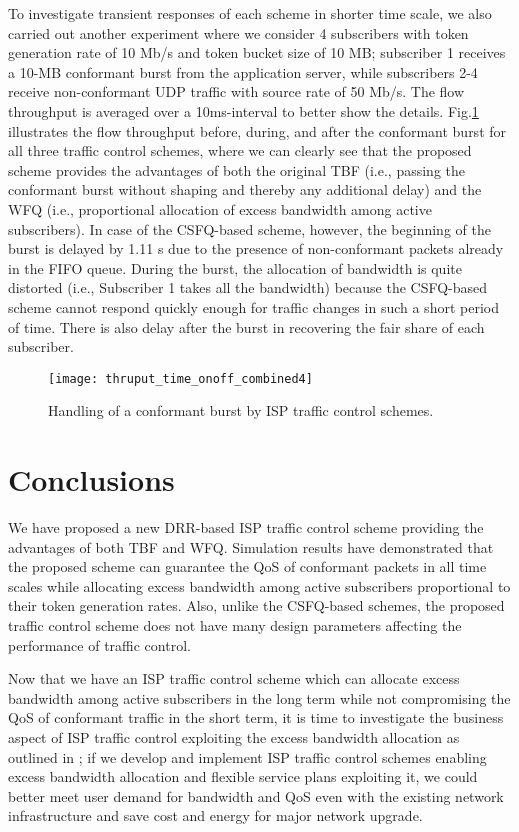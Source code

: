 \documentclass[conference,twoside,final]{IEEEtran}
\begin{document}
To investigate transient responses of each scheme in shorter time scale, we also
carried out another experiment where we consider 4 subscribers with token
generation rate of 10 Mb/s and token bucket size of 10 MB; subscriber 1 receives
a 10-MB conformant burst from the application server, while subscribers 2-4
receive non-conformant UDP traffic with source rate of 50 Mb/s. The flow
throughput is averaged over a 10ms-interval to better show the
details. Fig.\ref{fg:thruput_time_onoff} illustrates the flow throughput
before, during, and after the conformant burst for all three traffic control
schemes, where we can clearly see that the proposed scheme provides the
advantages of both the original TBF (i.e., passing the conformant burst without
shaping and thereby any additional delay) and the WFQ (i.e., proportional
allocation of excess bandwidth among active subscribers). In case of the
CSFQ-based scheme, however, the beginning of the burst is delayed by 1.11 s due
to the presence of non-conformant packets already in the FIFO queue. During the
burst, the allocation of bandwidth is quite distorted (i.e., Subscriber 1 takes
all the bandwidth) because the CSFQ-based scheme cannot respond quickly enough
for traffic changes in such a short period of time. There is also delay after
the burst in recovering the fair share of each subscriber.
\begin{figure}[!htb]
    \begin{center}
        \texttt{[image: thruput\_time\_onoff\_combined4]}
    \end{center}
    \caption{Handling of a conformant burst by ISP traffic control schemes.}
    \label{fg:thruput_time_onoff}
\end{figure}

\section{Conclusions}
\label{sec-4}
We have proposed a new DRR-based ISP traffic control scheme providing the
advantages of both TBF and WFQ. Simulation results have demonstrated that the
proposed scheme can guarantee the QoS of conformant packets in all time scales
while allocating excess bandwidth among active subscribers proportional to their
token generation rates. Also, unlike the CSFQ-based schemes, the proposed
traffic control scheme does not have many design parameters affecting the
performance of traffic control.

Now that we have an ISP traffic control scheme which can allocate excess
bandwidth among active subscribers in the long term while not compromising the
QoS of conformant traffic in the short term, it is time to investigate the
business aspect of ISP traffic control exploiting the excess bandwidth
allocation as outlined in \cite{Kim:14-5}; if we develop and implement ISP
traffic control schemes enabling excess bandwidth allocation and flexible
service plans exploiting it, we could better meet user demand for bandwidth and
QoS even with the existing network infrastructure and save cost and energy for
major network upgrade.
\end{document}
